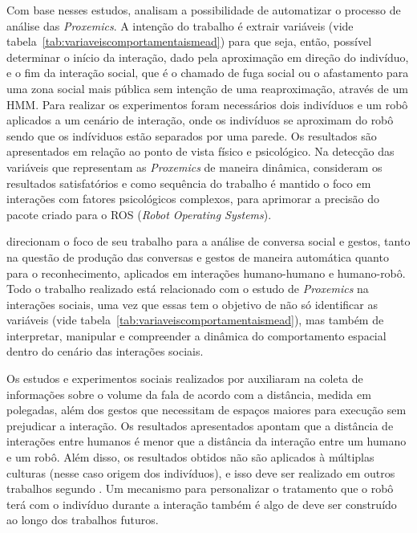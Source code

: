 Com base nesses estudos,  analisam a possibilidade de automatizar o processo de análise das \emph{Proxemics}. A intenção do trabalho é extrair variáveis (vide tabela~\ref{tab:variaveiscomportamentaismead}) para que seja, então, possível determinar o início da interação, dado pela aproximação em direção do indivíduo, e o fim da interação social, que é o chamado de fuga social ou o afastamento para uma zona social mais pública sem intenção de uma reaproximação, através de um HMM. Para realizar os experimentos foram necessários dois indivíduos e um robô aplicados a um cenário de interação, onde os indivíduos se aproximam do robô sendo que os indíviduos estão separados por uma parede. Os resultados são apresentados em relação ao ponto de vista físico e psicológico. Na detecção das variáveis que representam as \emph{Proxemics} de maneira dinâmica,  consideram os resultados satisfatórios e como sequência do trabalho é mantido o foco em interações com fatores psicológicos complexos, para aprimorar a precisão do pacote criado para o ROS (\emph{Robot Operating Systems}).

 direcionam o foco de seu trabalho para a análise de conversa social e gestos, tanto na questão de produção das conversas e gestos de maneira automática quanto para o reconhecimento, aplicados em interações humano-humano e humano-robô. Todo o trabalho realizado está relacionado com o estudo de \emph{Proxemics} na interações sociais, uma vez que essas tem o objetivo de não só identificar as variáveis (vide tabela~\ref{tab:variaveiscomportamentaismead}), mas também de interpretar, manipular e compreender a dinâmica do comportamento espacial dentro do cenário das interações sociais.

Os estudos e experimentos sociais realizados por  auxiliaram na coleta de informações sobre o volume da fala de acordo com a distância, medida em polegadas, além dos gestos que necessitam de espaços maiores para execução sem prejudicar a interação. Os resultados apresentados apontam que a distância de interações entre humanos é menor que a distância da interação entre um humano e um robô. Além disso, os resultados obtidos não são aplicados à múltiplas culturas (nesse caso origem dos indivíduos), e isso deve ser realizado em outros trabalhos segundo . Um mecanismo para personalizar o tratamento que o robô terá com o indivíduo durante a interação também é algo de deve ser construído ao longo dos trabalhos futuros.

